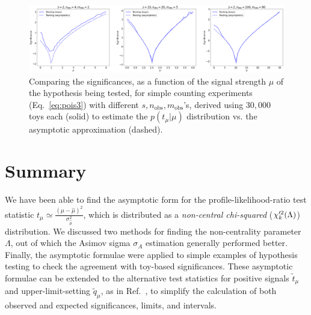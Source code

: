 \begin{figure}[htb]
  \centering
  \includegraphics[width=\textwidth]{figures/06-asymptotic-plr/5.png}
  \caption[Comparing the significances, as a function of the signal strength $\mu$ of the hypothesis being tested, for simple counting experiments (Eq.~\ref{eq:pois3}) with different $s, n_{\mathrm{obs}}, m_{\mathrm{obs}}$'s.]{Comparing the significances, as a function of the signal strength $\mu$ of the hypothesis being tested, for simple counting experiments (Eq.~\ref{eq:pois3}) with different $s, n_{\mathrm{obs}}, m_{\mathrm{obs}}$'s, derived using $30,000$ toys each (solid) to estimate the $p(t_\mu|\mu)$ distribution vs. the asymptotic approximation (dashed).}
  \label{fig:asym_significances}
\end{figure}


\section{Summary}

We have been able to find the asymptotic form for the profile-likelihood-ratio test statistic $t_\mu \simeq \frac{(\mu-\hat\mu)^2}{\sigma_{\hat\mu}^2}$, which is distributed as a \textit{non-central chi-squared} ($\chi^{\prime 2}_k(\Lambda)$) distribution.
We discussed two methods for finding the non-centrality parameter $\Lambda$, out of which the Asimov sigma $\sigma_A$ estimation generally performed better.
Finally, the asymptotic formulae were applied to simple examples of hypothesis testing to check the agreement with toy-based significances.
These asymptotic formulae can be extended to the alternative test statistics for positive signals $\tilde{t}_\mu$ and upper-limit-setting $\tilde{q}_\mu$, as in Ref.~\cite{Cowan:2010js}, to simplify the calculation of both observed and expected significances, limits, and intervals.